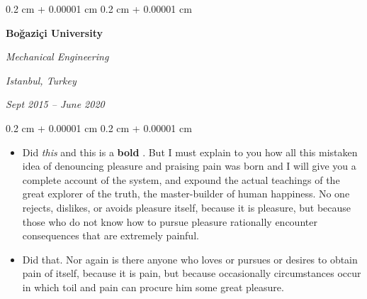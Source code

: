 \documentclass[10pt, letterpaper]{article}
\newenvironment{highlights}{
    \begin{itemize}[
        topsep=0.10 cm,
        parsep=0.10 cm,
        partopsep=0pt,
        itemsep=0pt,
        leftmargin=0.4 cm + 10pt
    ]
}{
    \end{itemize}
} %
\newenvironment{onecolentry}{
    \begin{adjustwidth}{
        0.2 cm + 0.00001 cm
    }{
        0.2 cm + 0.00001 cm
    }
}{
    \end{adjustwidth}
} %
\newenvironment{twocolentry}[2][]{
    \onecolentry
    \def\secondColumn{#2}
    \setcolumnwidth{\fill, 4.5 cm}
    \begin{paracol}{2}
}{
    \switchcolumn \raggedleft \secondColumn
    \end{paracol}
    \endonecolentry
} %
\let\hrefWithoutArrow\href
\renewcommand{\href}[2]{\hrefWithoutArrow{#1}{\ifthenelse{\equal{#2}{}}{ }{#2 }\raisebox{.15ex}{\footnotesize \faExternalLink*}}}
\begin{document}
        \vspace{0.2 cm}

        \begin{twocolentry}{
        \textit{Istanbul, Turkey}    
            
        \textit{Sept 2015 – June 2020}}
            \textbf{Boğaziçi University}

            \textit{Mechanical Engineering}
        \end{twocolentry}
        \vspace{0.10 cm}
        \begin{onecolentry}
            \begin{highlights}
                \item Did \textit{this} and this is a \textbf{bold} \href{https://example.com}{link}. But I must explain to you how all this mistaken idea of denouncing pleasure and praising pain was born and I will give you a complete account of the system, and expound the actual teachings of the great explorer of the truth, the master-builder of human happiness. No one rejects, dislikes, or avoids pleasure itself, because it is pleasure, but because those who do not know how to pursue pleasure rationally encounter consequences that are extremely painful.
                \item Did that. Nor again is there anyone who loves or pursues or desires to obtain pain of itself, because it is pain, but because occasionally circumstances occur in which toil and pain can procure him some great pleasure.
            \end{highlights}
        \end{onecolentry}


        \vspace{0.2 cm}
\end{document}
